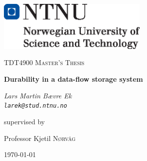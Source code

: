 \documentclass[b5paper]{report}
\begin{document}
\begin{titlepage}
  \centering
	\includegraphics[width=0.55\textwidth]{ntnu}\par\vspace{1cm}
	{\scshape\Large TDT4900 Master's Thesis \par}
	\vspace{1.5cm}
	{\huge\bfseries Durability in a data-flow storage system\par}
	\vspace{2cm}
	{\Large\itshape Lars Martin Bævre Ek \\ \texttt{larek@stud.ntnu.no} \par}
	\vfill
	supervised by\par
  Professor Kjetil \textsc{Nørvåg}

	{\large \today\par}
\end{titlepage}



\tableofcontents

\begin{abstract}
  
\end{abstract}

\ChTitleVar{\Huge\bfseries\rm}
\ChRuleWidth{1pt}










\appendix


\printbibliography
\end{document}
